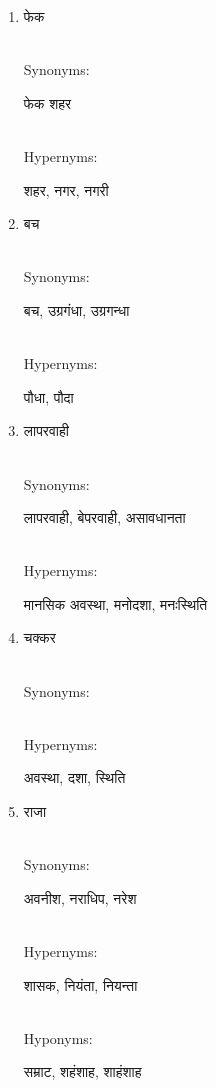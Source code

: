 \documentclass{article}
\begin{document}
\begin{enumerate}
\item \begin{hindi}फेक\end{hindi} \\
Synonyms: \begin{hindi}फेक शहर\end{hindi} \\
Hypernyms: \begin{hindi}शहर, नगर, नगरी\end{hindi}

\item \begin{hindi}बच\end{hindi} \\
Synonyms: \begin{hindi}बच, उग्रगंधा, उग्रगन्धा\end{hindi} \\
Hypernyms: \begin{hindi}पौधा, पौदा\end{hindi}

\item \begin{hindi}लापरवाही\end{hindi} \\
Synonyms: \begin{hindi}लापरवाही, बेपरवाही, असावधानता\end{hindi} \\
Hypernyms: \begin{hindi}मानसिक अवस्था, मनोदशा, मनःस्थिति\end{hindi}

\item \begin{hindi}चक्कर\end{hindi} \\
Synonyms: \begin{hindi}\end{hindi} \\
Hypernyms: \begin{hindi}अवस्था, दशा, स्थिति\end{hindi}

\item \begin{hindi}राजा\end{hindi} \\
Synonyms: \begin{hindi}अवनीश, नराधिप, नरेश\end{hindi} \\
Hypernyms: \begin{hindi}शासक, नियंता, नियन्ता\end{hindi} \\
Hyponyms: \begin{hindi}सम्राट, शहंशाह, शाहंशाह\end{hindi}


\end{enumerate}
\end{document}
